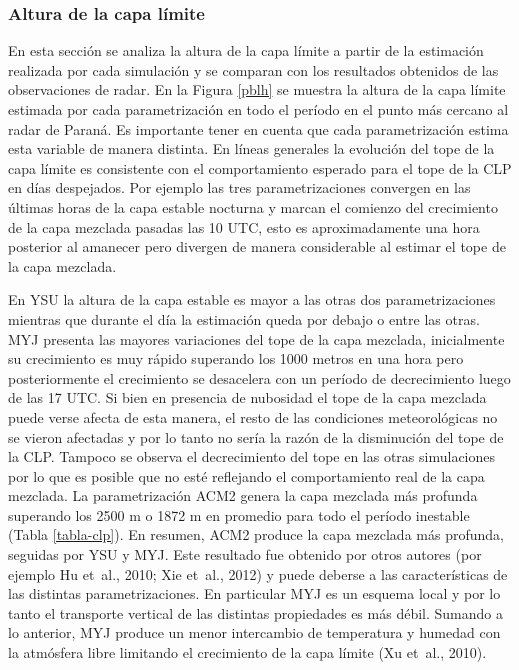 \documentclass[12pt,spanish,oneside, a4paper]{book}
\begin{document}
\subsubsection{Altura de la capa
límite}\label{altura-de-la-capa-limite-1}

En esta sección se analiza la altura de la capa límite a partir de la
estimación realizada por cada simulación y se comparan con los
resultados obtenidos de las observaciones de radar. En la Figura
\ref{pblh} se muestra la altura de la capa límite estimada por cada
parametrización en todo el período en el punto más cercano al radar de
Paraná. Es importante tener en cuenta que cada parametrización estima
esta variable de manera distinta. En líneas generales la evolución del
tope de la capa límite es consistente con el comportamiento esperado
para el tope de la CLP en días despejados. Por ejemplo las tres
parametrizaciones convergen en las últimas horas de la capa estable
nocturna y marcan el comienzo del crecimiento de la capa mezclada
pasadas las 10 UTC, esto es aproximadamente una hora posterior al
amanecer pero divergen de manera considerable al estimar el tope de la
capa mezclada.

En YSU la altura de la capa estable es mayor a las otras dos
parametrizaciones mientras que durante el día la estimación queda por
debajo o entre las otras. MYJ presenta las mayores variaciones del tope
de la capa mezclada, inicialmente su crecimiento es muy rápido superando
los 1000 metros en una hora pero posteriormente el crecimiento se
desacelera con un período de decrecimiento luego de las 17 UTC. Si bien
en presencia de nubosidad el tope de la capa mezclada puede verse afecta
de esta manera, el resto de las condiciones meteorológicas no se vieron
afectadas y por lo tanto no sería la razón de la disminución del tope de
la CLP. Tampoco se observa el decrecimiento del tope en las otras
simulaciones por lo que es posible que no esté reflejando el
comportamiento real de la capa mezclada. La parametrización ACM2 genera
la capa mezclada más profunda superando los 2500 m o 1872 m en promedio
para todo el período inestable (Tabla \ref{tabla-clp}). En resumen, ACM2
produce la capa mezclada más profunda, seguidas por YSU y MYJ. Este
resultado fue obtenido por otros autores (por ejemplo Hu et~al., 2010;
Xie et~al., 2012) y puede deberse a las características de las distintas
parametrizaciones. En particular MYJ es un esquema local y por lo tanto
el transporte vertical de las distintas propiedades es más débil.
Sumando a lo anterior, MYJ produce un menor intercambio de temperatura y
humedad con la atmósfera libre limitando el crecimiento de la capa
límite (Xu et~al., 2010).
\end{document}
